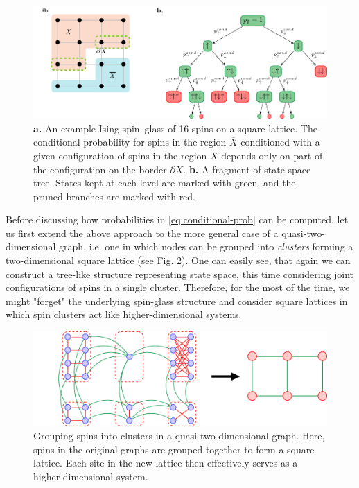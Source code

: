 \begin{figure}
  \centering
  \includegraphics[width=\textwidth]{figures/squarelattice.pdf}
  \caption{\textbf{a.} An example Ising spin--glass  of 16 spins on a square lattice. The conditional probability for spins in the region $\overline{X}$ conditioned with a given configuration of spins in the region $X$ depends only on part of the configuration on the border $\partial X$. \textbf{b.} A fragment of state space tree. States kept at each level
    are marked with green, and the pruned branches are marked with red.}
  \label{fig:lattice-and-border}
\end{figure}

Before discussing how probabilities in \eqref{eq:conditional-prob} can be
computed, let us first extend the above approach to the more general case of a
quasi-two-dimensional graph, i.e. one in which nodes can be grouped into
\emph{clusters} forming a two-dimensional square lattice (see Fig.
\ref{fig:clustering}). One can easily see, that again we can construct a
tree-like structure representing state space, this time considering joint
configurations of spins in a single cluster. Therefore, for the most of the
time, we might "forget" the underlying spin-glass structure and consider square
lattices in which spin clusters act like higher-dimensional systems.

\begin{figure}[b]
  \includegraphics[width=\textwidth]{figures/clustering}
  \caption{Grouping spins into clusters in a quasi-two-dimensional graph. Here, spins in
    the original graphs are grouped together to form a square lattice. Each site in
    the new lattice then effectively serves as a higher-dimensional system.}
  \label{fig:clustering}
\end{figure}

